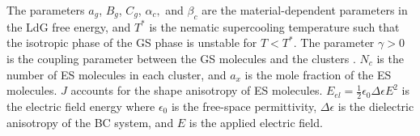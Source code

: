 \documentclass[reprint,amsfonts,amsmath,amssymb,aps,pre,floatfix,10pt]{revtex4-1}
\newcommand\n{\mathbf{n}}
\newcommand\Q{\mathbf{Q}}
\begin{document}
The parameters $a_g$, $B_g$, $C_g$, $\alpha_c,$ and $\beta_c$ are the material-dependent parameters in the LdG free energy, and $T^*$ is the nematic supercooling temperature such that the isotropic phase of the GS phase is unstable for $T < T^*$. The parameter
$\gamma > 0$ is the coupling parameter between the GS molecules and
the clusters \cite{madhusudana2017two_36}.
$N_c$ is the number of
ES molecules in each cluster, and $a_x$ is the mole fraction of
the ES molecules. $J$ accounts for the shape anisotropy of ES
molecules. $E_{el} = \frac{1}{2} \epsilon_0 \Delta \epsilon E^2$ is the electric field energy where $\epsilon_0$
is the free-space permittivity,  $\Delta \epsilon$ is the dielectric anisotropy of the BC system, and $E$ is the applied electric field.
\end{document}
